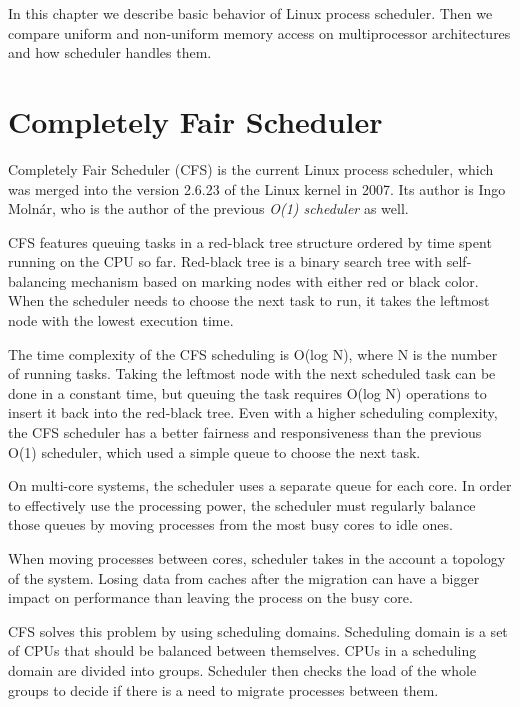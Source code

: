 In this chapter we describe basic behavior of Linux process scheduler. Then we
compare uniform and non-uniform memory access on multiprocessor architectures
and how scheduler handles them.

\section{Completely Fair Scheduler}
Completely Fair Scheduler (CFS) is the current Linux process scheduler, which was
merged into the version 2.6.23 of the Linux kernel in 2007. Its author is Ingo
Molnár, who is the author of the previous \emph{O(1) scheduler} as well.

CFS features queuing tasks in a red-black tree structure ordered by time spent
running on the CPU so far. Red-black tree is a binary search
tree with self-balancing mechanism based on marking nodes with either red or
black color. When the scheduler needs to choose the next task to run, it takes
the leftmost node with the lowest execution time.

The time complexity of the CFS scheduling is O(log N), where N is the number
of running tasks. Taking the leftmost node
with the next scheduled task can be done in a constant time, but queuing the task
requires O(log N) operations to insert it back into the red-black tree. Even
with a higher scheduling complexity, the CFS scheduler has a better fairness and
responsiveness than the previous O(1) scheduler, which used a simple queue to
choose the next task.

On multi-core systems, the scheduler uses a separate queue for each core. In
order to effectively use the processing power, the scheduler must regularly
balance those queues by moving processes from the most busy cores to idle ones.

When moving processes between cores, scheduler takes in the account a topology
of the system. Losing data from caches after the migration can have a bigger
impact on performance than leaving the process on the busy core.

CFS solves this problem by using scheduling domains. Scheduling domain is a set
of CPUs that should be balanced between themselves. CPUs in a scheduling domain
are divided into groups. Scheduler then checks the load of the whole groups to
decide if there is a need to migrate processes between them.

